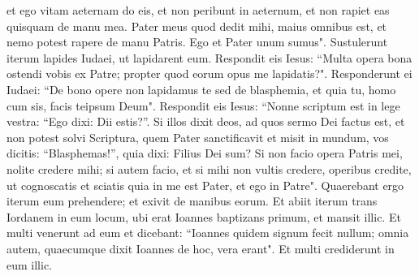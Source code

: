\begin{biblechapter}
\verse et ego vitam aeternam do eis, et non peribunt in aeternum, et non rapiet eas quisquam de manu mea. 
\verse Pater meus quod dedit mihi, maius omnibus est, et nemo potest rapere de manu Patris. 
\verse Ego et Pater unum sumus". 
\verse Sustulerunt iterum lapides Iudaei, ut lapidarent eum. 
\verse Respondit eis Iesus: “Multa opera bona ostendi vobis ex Patre; propter quod eorum opus me lapidatis?". 
\verse Responderunt ei Iudaei: “De bono opere non lapidamus te sed de blasphemia, et quia tu, homo cum sis, facis teipsum Deum". 
\verse Respondit eis Iesus: “Nonne scriptum est in lege vestra: “Ego dixi: Dii estis?”. 
\verse Si illos dixit deos, ad quos sermo Dei factus est, et non potest solvi Scriptura, 
\verse quem Pater sanctificavit et misit in mundum, vos dicitis: “Blasphemas!”, quia dixi: Filius Dei sum? 
\verse Si non facio opera Patris mei, nolite credere mihi; 
\verse si autem facio, et si mihi non vultis credere, operibus credite, ut cognoscatis et sciatis quia in me est Pater, et ego in Patre". 
\verse Quaerebant ergo iterum eum prehendere; et exivit de manibus eorum. 
\verse Et abiit iterum trans Iordanem in eum locum, ubi erat Ioannes baptizans primum, et mansit illic. 
\verse Et multi venerunt ad eum et dicebant: “Ioannes quidem signum fecit nullum; omnia autem, quaecumque dixit Ioannes de hoc, vera erant". 
\verse Et multi crediderunt in eum illic. 
\end{biblechapter}


